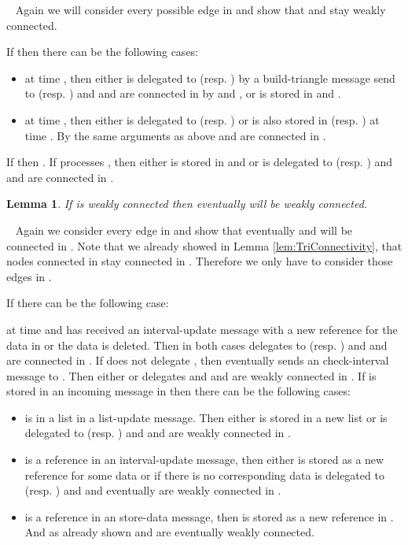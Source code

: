 \documentclass[11pt]{article}
\newtheorem{lemma}[theorem]{Lemma}
\newcommand{\sq}{\hbox{\rlap{}}}
\newcommand{\qed}{\hspace*{\fill}\sq}
\newenvironment{proof}{\noindent {\bf Proof.}\ }{\qed\par\vskip 4mm\par}
\begin{document}
\begin{proof}
Again we will consider every possible edge  in  and show that  and  stay weakly connected.

If  then there can be the following cases:

\begin{itemize}
  \item  at time , then either  is delegated to  (resp. ) by a build-triangle message send to  (resp. ) and  and  are connected in  by  and , or  is stored in  and .
  \item  at time , then either  is delegated to  (resp. ) or  is also stored in  (resp. ) at time . By the same arguments as above  and  are connected in .
\end{itemize}

If  then . If  processes , then either  is stored in  and  or  is delegated to  (resp. ) and  and  are connected in .
\end{proof}

\begin{lemma}\label{lem:TriConnectivity2}
If  is weakly connected then eventually  will be weakly connected.
\end{lemma}

\begin{proof}
Again we consider every edge  in  and show that eventually  and  will be connected in . Note that we already showed in Lemma \ref{lem:TriConnectivity}, that nodes connected in  stay connected in . Therefore we only have to consider those edges in .

If  there can be the following case:

 at time  and  has received an interval-update message with a new reference for the data in  or the data is deleted. Then in both cases  delegates  to  (resp. ) and  and  are connected in . If  does not delegate , then  eventually sends an check-interval message to . Then either  or  delegates  and  and  are weakly connected in . If  is stored in an incoming message in  then there can be the following cases:

\begin{itemize}
  \item  is in a list in a list-update message. Then either  is stored in a new list  or  is delegated to  (resp. ) and  and  are weakly connected in .
  \item  is a reference in an interval-update message, then either  is stored as a new reference for some data or if there is no corresponding data  is delegated to  (resp. ) and  and  eventually are weakly connected in .
  \item  is a reference in an store-data message, then  is stored as a new reference in . And as already shown  and  are eventually weakly connected.
\end{itemize}
\end{proof}
\end{document}
